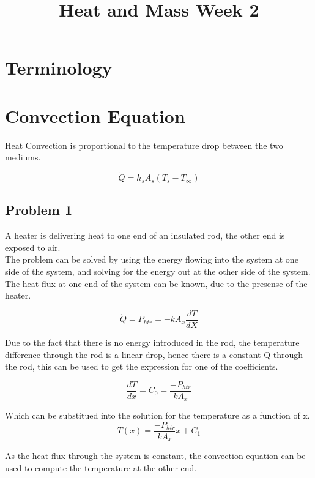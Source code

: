 \documentclass[•]{article}
\begin{document}
\title{Heat and Mass Week 2}
\maketitle
\section*{Terminology}
\section*{Convection Equation}
Heat Convection is proportional to the temperature drop between the two mediums.

\begin{equation}
\dot{Q} = h_sA_s(T_s - T_{\infty})
\end{equation}

\subsection*{Problem 1}
A heater is delivering heat to one end of an insulated rod, the other end is exposed to air.\\

The problem can be solved by using the energy flowing into the system at one side of the system, and solving for the energy out at the other side of the system. The heat flux at one end of the system can be known, due to the presense of the heater.

\begin{equation}
\dot{Q} = P_{htr} = -kA_x\frac{dT}{dX}
\end{equation}

Due to the fact that there is no energy introduced in the rod, the temperature difference through the rod is a linear drop, hence there is a constant Q through the rod, this can be used to get the expression for one of the coefficients.

\begin{equation}
\frac{dT}{dx} = C_0 = \frac{-P_{htr}}{kA_x}
\end{equation}

Which can be substitued into the solution for the temperature as a function of x.
\begin{equation}
T(x) = \frac{-P_{htr}}{kA_x}x + C_1
\end{equation}

As the heat flux through the system is constant, the convection equation can be used to compute the temperature at the other end.
\end{document}
